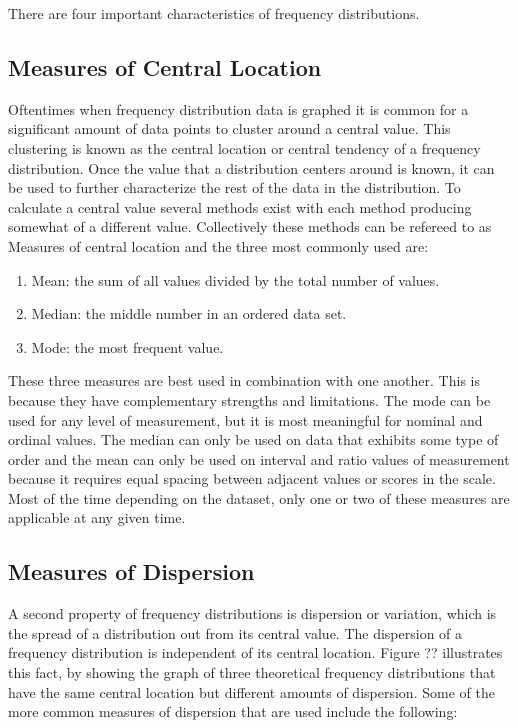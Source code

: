 There are four important characteristics of frequency distributions.

\subsection{Measures of Central Location}

Oftentimes when frequency distribution data is graphed it is common for a significant
amount of data points to cluster around a central value. This clustering is known 
as the central location or central tendency of a frequency distribution. Once the 
value that a distribution centers around is known, it can be used to further 
characterize the rest of the data in the distribution. To calculate a central value 
several methods exist with each method producing somewhat of a different value. 
Collectively these methods can be refereed to as Measures of central location and 
the three most commonly used are:

\begin{enumerate}
    \item Mean: the sum of all values divided by the total number of values.
    \item Median: the middle number in an ordered data set.
    \item Mode: the most frequent value.
\end{enumerate}

These three measures are best used in combination with one another. This is because 
they have complementary strengths and limitations. The mode can be used for any 
level of measurement, but it is most meaningful for nominal and ordinal values.
The median can only be used on data that exhibits some type of order and the mean 
can only be used on interval and ratio values of measurement because it requires 
equal spacing between adjacent values or scores in the scale. Most of the time 
depending on the dataset, only one or two of these measures are applicable at any 
given time.

\subsection{Measures of Dispersion}

A second property of frequency distributions is dispersion or variation, which is 
the spread of a distribution out from its central value. The dispersion of a frequency 
distribution is independent of its central location. Figure ?? illustrates this 
fact, by showing the graph of three theoretical frequency distributions that have 
the same central location but different amounts of dispersion. Some of the more common
measures of dispersion that are used include the following:

